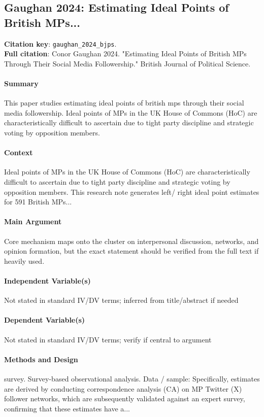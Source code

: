 \documentclass[12pt]{article}
\begin{document}
\subsection{Gaughan 2024: Estimating Ideal Points of British MPs...}
\textbf{Citation key}: \texttt{gaughan\_2024\_bjps}.\\
\textbf{Full citation}: Conor Gaughan 2024. "Estimating Ideal Points of British MPs Through Their Social Media Followership." British Journal of Political Science.

\paragraph{Summary} This paper studies estimating ideal points of british mps through their social media followership. Ideal points of MPs in the UK House of Commons (HoC) are characteristically difficult to ascertain due to tight party discipline and strategic voting by opposition members.

\paragraph{Context} Ideal points of MPs in the UK House of Commons (HoC) are characteristically difficult to ascertain due to tight party discipline and strategic voting by opposition members. This research note generates left/ right ideal point estimates for 591 British MPs...

\paragraph{Main Argument} Core mechanism maps onto the cluster on interpersonal discussion, networks, and opinion formation, but the exact statement should be verified from the full text if heavily used.

\paragraph{Independent Variable(s)} Not stated in standard IV/DV terms; inferred from title/abstract if needed

\paragraph{Dependent Variable(s)} Not stated in standard IV/DV terms; verify if central to argument

\paragraph{Methods and Design} survey. Survey-based observational analysis. Data / sample: Specifically, estimates are derived by conducting correspondence analysis (CA) on MP Twitter (X) follower networks, which are subsequently validated against an expert survey, confirming that these estimates have a...
\end{document}
